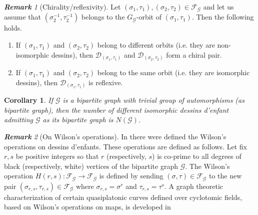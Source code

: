 \documentclass[12pt]{amsart}
\newtheorem{coro}{Corollary}
\theoremstyle{remark}
\newtheorem{rema}{\bf Remark}
\begin{document}
{\vspace{0.3cm}}
\noindent
\begin{rema}[Chirality/reflexivity] 
Let $(\sigma_{1},\tau_{1}), (\sigma_{2},\tau_{2}) \in {\mathcal F}_{\mathcal G}$ and let us assume that $(\sigma_{2}^{-1},\tau_{2}^{-1})$ belongs to the $G_{\mathcal G}$-orbit of $(\sigma_{1},\tau_{1})$. Then the following holds.
\begin{enumerate}
\item If $(\sigma_{1},\tau_{1})$ and $(\sigma_{2},\tau_{2})$ belong to different orbits (i.e. they are non-isomorphic dessins), then ${\mathcal D}_{(\sigma_{1},\tau_{1})}$ and ${\mathcal D}_{(\sigma_{2},\tau_{2})}$  form a chiral pair.
\item If $(\sigma_{1},\tau_{1})$ and $(\sigma_{2},\tau_{2})$ belong to the same orbit (i.e. they are isomorphic dessins), then ${\mathcal D}_{(\sigma_{1},\tau_{1})}$ is reflexive.
\end{enumerate}
\end{rema}

{\vspace{0.3cm}}
\noindent
\begin{coro}
If ${\mathcal G}$ is a bipartite graph with trivial group of automorphisms (as bipartite graph), then the number of different 
isomorphic dessins d'enfant admitting ${\mathcal G}$ as its bipartite graph is $N({\mathcal G})$.
\end{coro}

{\vspace{0.3cm}}
\noindent
\begin{rema}[On Wilson's operations]
In \cite{Wilson} there were defined the Wilson's operations on dessins d'enfants. These operations are defined as follows. Let fix $r,s$ be positive  integers so that $r$ (respectively, $s$) is co-prime to all degrees of black (respectively, white) vertices of the bipartite graph ${\mathcal G}$. The Wilson's operation $H(r,s):{\mathcal F}_{\mathcal G} \to {\mathcal F}_{\mathcal G}$ is defined by sending 
$(\sigma,\tau) \in {\mathcal F}_{\mathcal G}$ to the new pair $(\sigma_{r,s},\tau_{r,s}) \in {\mathcal F}_{\mathcal G}$ where $\sigma_{r,s}=\sigma^{r}$ and $\tau_{r,s}=\tau^{s}$.  A graph theoretic characterization of certain quasiplatonic curves defined over cyclotomic fields, based on Wilson's operations on maps, is developed in \cite{J-S-W}
\end{rema}

{\vspace{0.3cm}}
\end{document}
